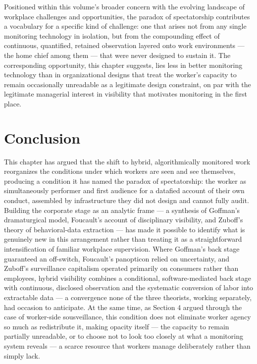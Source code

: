 \documentclass[12pt, a4paper]{article}
\begin{document}
Positioned within this volume's broader concern with the evolving landscape of workplace challenges and opportunities, the paradox of spectatorship contributes a vocabulary for a specific kind of challenge: one that arises not from any single monitoring technology in isolation, but from the compounding effect of continuous, quantified, retained observation layered onto work environments --- the home chief among them --- that were never designed to sustain it. The corresponding opportunity, this chapter suggests, lies less in better monitoring technology than in organizational designs that treat the worker's capacity to remain occasionally unreadable as a legitimate design constraint, on par with the legitimate managerial interest in visibility that motivates monitoring in the first place.

\section{Conclusion}

This chapter has argued that the shift to hybrid, algorithmically monitored work reorganizes the conditions under which workers are seen and see themselves, producing a condition it has named the paradox of spectatorship: the worker as simultaneously performer and first audience for a datafied account of their own conduct, assembled by infrastructure they did not design and cannot fully audit. Building the corporate stage as an analytic frame --- a synthesis of Goffman's dramaturgical model, Foucault's account of disciplinary visibility, and Zuboff's theory of behavioral-data extraction --- has made it possible to identify what is genuinely new in this arrangement rather than treating it as a straightforward intensification of familiar workplace supervision. Where Goffman's back stage guaranteed an off-switch, Foucault's panopticon relied on uncertainty, and Zuboff's surveillance capitalism operated primarily on consumers rather than employees, hybrid visibility combines a conditional, software-mediated back stage with continuous, disclosed observation and the systematic conversion of labor into extractable data --- a convergence none of the three theorists, working separately, had occasion to anticipate. At the same time, as Section 4 argued through the case of worker-side sousveillance, this condition does not eliminate worker agency so much as redistribute it, making opacity itself --- the capacity to remain partially unreadable, or to choose not to look too closely at what a monitoring system reveals --- a scarce resource that workers manage deliberately rather than simply lack.
\end{document}
